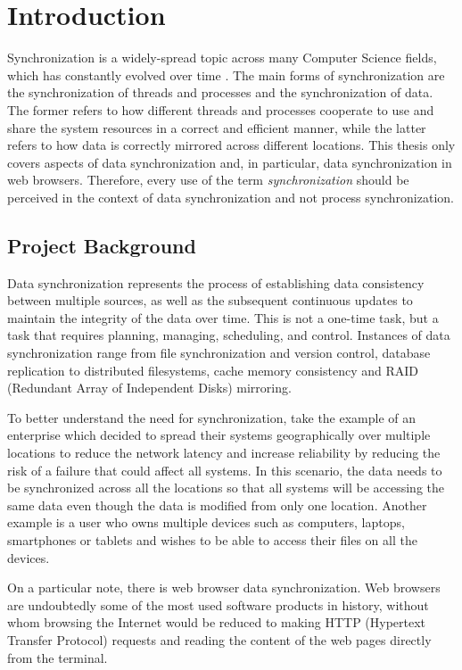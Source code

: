 \chapter{Introduction}
\label{chapter:introduction}

Synchronization is a widely-spread topic across many Computer Science fields, which has constantly evolved over time \cite{shin1994real}. The main forms of synchronization are the synchronization of threads and processes and the synchronization of data. The former refers to how different threads and processes cooperate to use and share the system resources in a correct and efficient manner, while the latter refers to how data is correctly mirrored across different locations. This thesis only covers aspects of data synchronization and, in particular, data synchronization in web browsers. Therefore, every use of the term \textit{synchronization} should be perceived in the context of data synchronization and not process synchronization.

\section{Project Background}
\label{sec:project-background}

Data synchronization represents the process of establishing data consistency between multiple sources, as well as the subsequent continuous updates to maintain the integrity of the data over time. This is not a one-time task, but a task that requires planning, managing, scheduling, and control. Instances of data synchronization range from file synchronization and version control, database replication to distributed filesystems, cache memory consistency and RAID (Redundant Array of Independent Disks) mirroring.

To better understand the need for synchronization, take the example of an enterprise which decided to spread their systems geographically over multiple locations to reduce the network latency and increase reliability by reducing the risk of a failure that could affect all systems. In this scenario, the data needs to be synchronized across all the locations so that all systems will be accessing the same data even though the data is modified from only one location. Another example is a user who owns multiple devices such as computers, laptops, smartphones or tablets and wishes to be able to access their files on all the devices.

On a particular note, there is web browser data synchronization. Web browsers are undoubtedly some of the most used software products in history, without whom browsing the Internet would be reduced to making HTTP (Hypertext Transfer Protocol) requests and reading the content of the web pages directly from the terminal.

